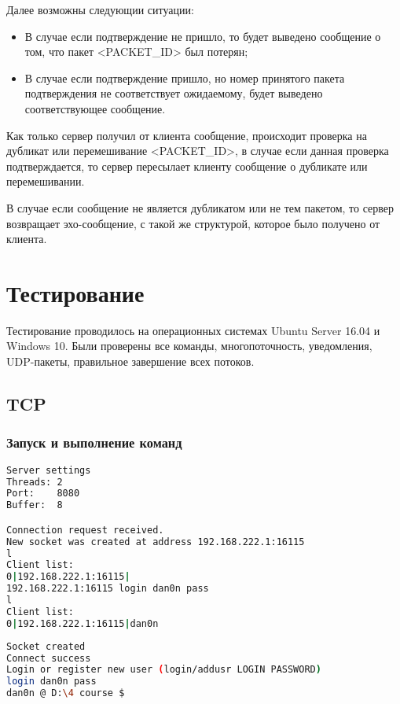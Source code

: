 Далее возможны следующии ситуации:

\begin{itemize}
	\item В случае если подтверждение не пришло, то будет выведено сообщение о том, что пакет <PACKET\_ID> был потерян;
	\item В случае если подтверждение пришло, но номер принятого пакета подтверждения не соответствует ожидаемому, будет выведено соответствующее сообщение.
\end{itemize}

Как только сервер получил от клиента сообщение, происходит проверка на дубликат или перемешивание <PACKET\_ID>, в случае если данная проверка подтверждается, то сервер пересылает клиенту сообщение о дубликате или перемешивании.

В случае если сообщение не является дубликатом или не тем пакетом, то сервер возвращает эхо-сообщение, с такой же структурой, которое было получено от клиента.

\section{Тестирование}

Тестирование проводилось на операционных системах Ubuntu Server 16.04 и Windows 10. Были проверены все команды, многопоточность, уведомления, UDP-пакеты, правильное завершение всех потоков.

\subsection{TCP}

\subsubsection{Запуск и выполнение команд}

\begin{lstlisting}[language=bash, caption=Лог сервера]
Server settings
Threads: 2
Port:    8080
Buffer:  8

Connection request received.
New socket was created at address 192.168.222.1:16115
l
Client list:
0|192.168.222.1:16115|
192.168.222.1:16115 login dan0n pass
l
Client list:
0|192.168.222.1:16115|dan0n
\end{lstlisting}

\begin{lstlisting}[language=bash, caption=Лог клиента]
Socket created
Connect success
Login or register new user (login/addusr LOGIN PASSWORD)
login dan0n pass
dan0n @ D:\4 course $

\end{lstlisting}

